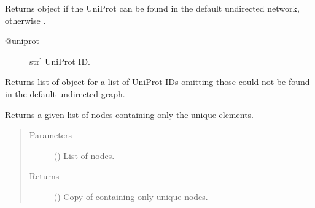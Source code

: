 \documentclass[letterpaper,10pt,english]{sphinxmanual}
\begin{document}
\begin{fulllineitems}
\begin{fulllineitems}
\label{\detokenize{main:pypath.main.PyPath.uniprot}}
Returns  object if the UniProt
can be found in the default undirected network,
otherwise .
\begin{description}
\item[{@uniprot}] \leavevmode{[}str{]}
UniProt ID.

\end{description}

\end{fulllineitems}


\begin{fulllineitems}
\label{\detokenize{main:pypath.main.PyPath.uniprots}}
Returns list of  object
for a list of UniProt IDs omitting those
could not be found in the default
undirected graph.

\end{fulllineitems}


\begin{fulllineitems}
\label{\detokenize{main:pypath.main.PyPath.uniq_node_list}}
Returns a given list of nodes containing only the unique
elements.
\begin{quote}\begin{description}
\item[{Parameters}] \leavevmode
{} () \textendash{} List of nodes.

\item[{Returns}] \leavevmode
() \textendash{} Copy of  containing only unique nodes.

\end{description}\end{quote}

\end{fulllineitems}



\end{fulllineitems}
\end{document}
